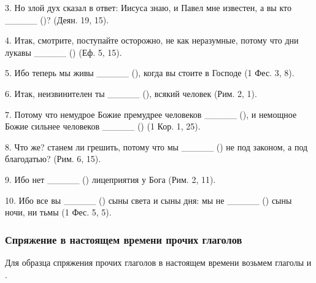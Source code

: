 \documentclass[11pt,a4paper,oneside]{memoir}
\begin{document}
    3. Но злой дух сказал в ответ: Иисуса знаю, и Павел мне известен, а вы кто _____ ({})? (Деян. 19, 15).
    
    4. Итак, смотрите, поступайте осторожно, не как неразумные, потому что дни лукавы _____ ({}) (Еф. 5, 15).
    
    5. Ибо теперь мы живы _____ ({}), когда вы стоите в Господе (1 Фес. 3, 8).
    
    6. Итак, неизвинителен ты _____ ({}), всякий человек (Рим. 2, 1).
    
    7. Потому что немудрое Божие премудрее человеков _____ ({}), и немощное Божие сильнее человеков _____ ({}) (1 Кор. 1, 25).
    
    8. Что же? станем ли грешить, потому что мы _____ ({}) не под законом, а под благодатью? (Рим. 6, 15).
    
    9. Ибо нет _____ ({}) лицеприятия у Бога (Рим. 2, 11).
    
    10. Ибо все вы _____ ({}) сыны света и сыны дня: мы не _____ ({}) сыны ночи, ни тьмы (1 Фес. 5, 5).
    \pagebreak
    
                \subsubsection{Спряжение в настоящем времени прочих глаголов}

    Для образца спряжения прочих глаголов в настоящем времени возьмем глаголы {} и {}.
    
\end{document}
